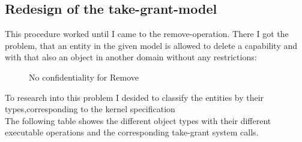 \documentclass[pdftex,11pt,a4paper]{article}
\begin{document}
\subsection{Redesign of the take-grant-model}
This procedure worked until I came to the remove-operation. There I got the problem, that an entity in the given model is allowed to delete a capability and with that also an object in another domain without any restrictions:
\begin{figure}[H]
\caption{No confidentiality for Remove}
\end{figure}
To research into this problem I desided to classify the entities by their types,corresponding to the kernel specification \cite{Manual} \\ 
The following table showes the different object types with their different executable operations and the corresponding take-grant system calls. \\ 
\end{document}
